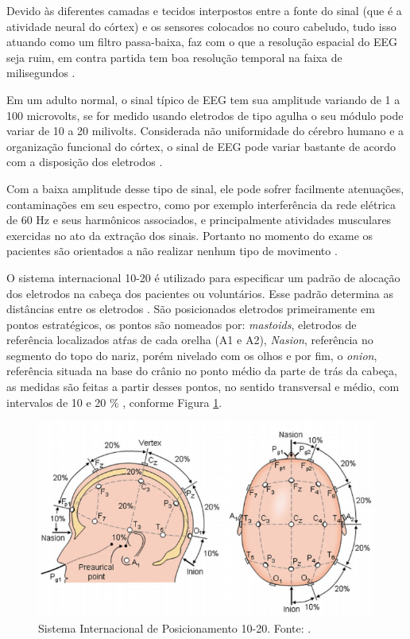 Devido às diferentes camadas e tecidos interpostos entre a fonte do sinal (que é a atividade neural do córtex) e os sensores colocados no couro cabeludo, tudo isso atuando como um filtro passa-baixa, faz com o que a resolução 
espacial do EEG seja ruim, em contra partida tem boa resolução temporal na faixa de milisegundos \cite{raobrain}.
 
Em um adulto normal, o sinal típico de EEG tem sua amplitude variando de 1 a 100 microvolts, se for medido usando eletrodos de tipo agulha o seu módulo pode variar de 10 a 20 milivolts. Considerada não uniformidade do cérebro humano e a organização funcional do córtex, o sinal de EEG pode variar bastante de acordo com a disposição dos eletrodos \cite{SIULYDissertacao}.

Com a baixa amplitude desse tipo de sinal, ele pode sofrer facilmente atenuações, contaminações em seu espectro, como por exemplo interferência da rede elétrica de 60 Hz e seus harmônicos associados, e principalmente atividades musculares exercidas no ato da extração dos sinais. Portanto no momento do exame os pacientes são orientados a não realizar nenhum tipo de movimento \cite{raobrain}.

 O sistema internacional 10-20 é utilizado para especificar um padrão de alocação dos eletrodos na cabeça dos pacientes ou voluntários. Esse padrão determina as distâncias entre os eletrodos \cite{Siulybook}. São posicionados eletrodos primeiramente em pontos estratégicos, os pontos são nomeados por: \textit{mastoids}, eletrodos de referência localizados atŕas de cada orelha (A1 e A2), \textit{Nasion}, referência no segmento do topo do nariz, porém nivelado com os olhos e por fim, o \textit{onion}, referência situada na base do crânio no ponto médio da parte de trás da cabeça, as medidas são feitas a partir desses pontos, no sentido transversal e médio,  com intervalos de 10 e 20 \% \cite{raobrain}, conforme Figura \ref{padrao1020}.

\begin{figure}[h]
	\centering
	\includegraphics[scale=0.75]{figuras/padrao1020.png}
	\caption{Sistema Internacional de Posicionamento 10-20. Fonte: \cite{campisi2012eeg}.}
	\label{padrao1020}
\end{figure}

